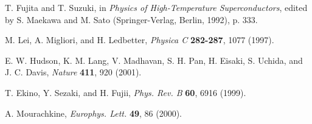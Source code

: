\begin{references}
 T. Fujita and T. Suzuki, in {\it Physics of High-Temperature
Superconductors}, edited by S. Maekawa and M. Sato (Springer-Verlag, Berlin,
1992), p. 333. 

 M. Lei, A. Migliori, and H. Ledbetter, {\it Physica C} 
{\bf 282-287}, 1077 (1997).


 E. W. Hudson, K. M. Lang, V. Madhavan, S. H. Pan, H. Eisaki,
S. Uchida, and J. C. Davis, {\it Nature} {\bf 411}, 920 (2001).

 T. Ekino, Y. Sezaki, and H. Fujii, {\it Phys. Rev. B} {\bf 60}, 
6916 (1999).

 A. Mourachkine, {\it Europhys. Lett.} {\bf 49}, 86 (2000).

\end{references}



